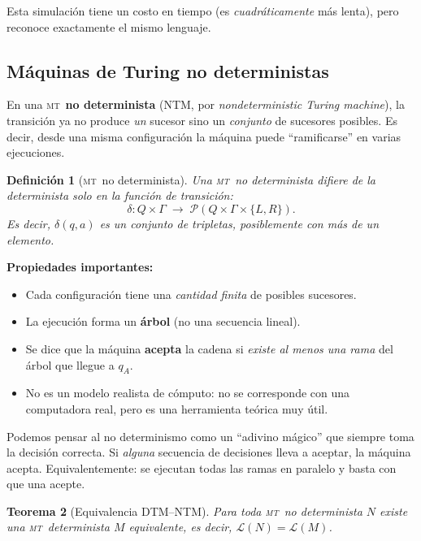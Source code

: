 \documentclass[11pt,a4paper]{article}
\theoremstyle{definicion}
\newtheorem{definicion}{Definición}[section]
\newtheorem{teorema}[definicion]{Teorema}
\newcommand{\MT}{\textsc{mt}}
\begin{document}
Esta simulación tiene un costo en tiempo (es \emph{cuadráticamente} más lenta), pero reconoce exactamente el mismo lenguaje.

\subsection{Máquinas de Turing no deterministas}

En una \MT\ \textbf{no determinista} (NTM, por \emph{nondeterministic Turing machine}), la transición ya no produce \emph{un} sucesor sino un \emph{conjunto} de sucesores posibles. Es decir, desde una misma configuración la máquina puede ``ramificarse'' en varias ejecuciones.

\begin{definicion}[\MT\ no determinista]
Una \MT\ no determinista difiere de la determinista solo en la función de transición:
\[
\delta : Q \times \Gamma \;\longrightarrow\; \mathcal{P}(Q \times \Gamma \times \{L, R\}).
\]
Es decir, $\delta(q, a)$ es un \emph{conjunto} de tripletas, posiblemente con más de un elemento.
\end{definicion}

\textbf{Propiedades importantes:}
\begin{itemize}
    \item Cada configuración tiene una \emph{cantidad finita} de posibles sucesores.
    \item La ejecución forma un \textbf{árbol} (no una secuencia lineal).
    \item Se dice que la máquina \textbf{acepta} la cadena si \emph{existe al menos una rama} del árbol que llegue a $q_A$.
    \item No es un modelo realista de cómputo: no se corresponde con una computadora real, pero es una herramienta teórica muy útil.
\end{itemize}

\begin{intuicion}
Podemos pensar al no determinismo como un ``adivino mágico'' que siempre toma la decisión correcta. Si \emph{alguna} secuencia de decisiones lleva a aceptar, la máquina acepta. Equivalentemente: se ejecutan todas las ramas en paralelo y basta con que una acepte.
\end{intuicion}

\begin{teorema}[Equivalencia DTM--NTM]
Para toda \MT\ no determinista $N$ existe una \MT\ determinista $M$ equivalente, es decir, $\mathcal{L}(N) = \mathcal{L}(M)$.
\end{teorema}
\end{document}
